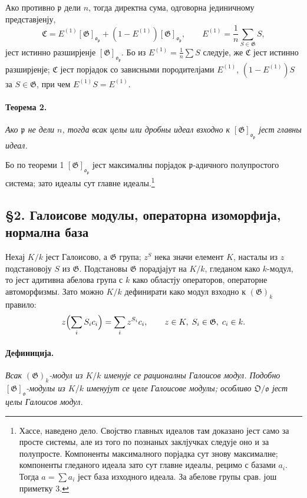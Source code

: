 \documentclass[11pt]{article}
\providecommand{\frakO}{\mathfrak{O}}
\providecommand{\frako}{\mathfrak{o}}
\providecommand{\frakp}{\mathfrak{p}}
\providecommand{\Gg}{\mathfrak{G}}
\begin{document}
Ако противно \(\frakp\) дели \(n\), тогда директна сума, одговорна јединичному представјенју,
\[
        \mathfrak C=E^{(1)}[\Gg]_{\frako_\frakp}+(1-E^{(1)})[\Gg]_{\frako_\frakp},
        \qquad
        E^{(1)}=\frac1n\sum_{S\in\Gg} S,
\]
јест истинно разширјенје \([\Gg]_{\frako_\frakp}\). Бо из \(E^{(1)}=\frac1n\sum S\) следује, же \(\mathfrak C\) јест истинно разширјенје; \(\mathfrak C\) јест порјадок со зависными породителјами \(E^{(1)}\), \((1-E^{(1)})S\) за \(S\in\Gg\), при чем \(E^{(1)}S=E^{(1)}\).

\paragraph{Теорема 2.}
\emph{Ако \(\frakp\) не дели \(n\), тогда всак целы или дробны идеал взходно к \([\Gg]_{\frako_\frakp}\) јест главны идеал.}

Бо по теореми 1 \([\Gg]_{\frako_\frakp}\) јест максималны порјадок \(\frakp\)-адичного полупростого система; зато идеалы сут главне идеалы.\footnote{Хассе, наведено дело. Својство главных идеалов там доказано јест само за просте системы, але из того по познаных заклјучках следује оно и за полупросте. Компоненты максималного порјадка сут знову максималне; компоненты гледаного идеала зато сут главне идеалы, рецимо с базами \(a_i\). Тогда \(a=\sum a_i\) јест база изходного идеала. За абелове групы срав. још приметку 3.}

\subsection*{§2. Галоисове модулы, операторна изоморфија, нормална база}

Нехај \(K/k\) јест Галоисово, а \(\Gg\) група; \(z^S\) нека значи елемент \(K\), насталы из \(z\) подстановоју \(S\) из \(\Gg\). Подстановы \(\Gg\) порадјајут на \(K/k\), гледаном како \(k\)-модул, то јест адитивна абелова група с \(k\) како областју операторов, операторне автоморфизмы. Зато можно \(K/k\) дефинирати како модул взходно к \((\Gg)_k\) правило:
\[
        z\Bigl(\sum_i S_i c_i\Bigr)=\sum_i z^{S_i}c_i,
        \qquad z\in K,\; S_i\in\Gg,\; c_i\in k.
\]

\paragraph{Дефиниција.}
\emph{Всак \((\Gg)_k\)-модул из \(K/k\) именује се рационалны Галоисов модул. Подобно \([\Gg]_\frako\)-модулы из \(K/k\) именујут се целе Галоисове модулы; особливо \(\frakO/\frako\) јест целы Галоисов модул.}
\end{document}

